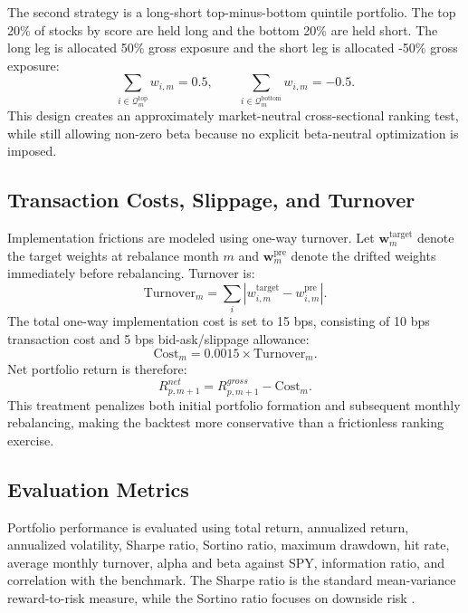 \documentclass[11pt, a4paper]{article}
\begin{document}
The second strategy is a long-short top-minus-bottom quintile portfolio. The top 20\% of stocks by score are held long and the bottom 20\% are held short. The long leg is allocated 50\% gross exposure and the short leg is allocated -50\% gross exposure:
\begin{equation}
\sum_{i\in\mathcal{Q}^{\text{top}}_{m}} w_{i,m}=0.5, \qquad
\sum_{i\in\mathcal{Q}^{\text{bottom}}_{m}} w_{i,m}=-0.5.
\end{equation}
This design creates an approximately market-neutral cross-sectional ranking test, while still allowing non-zero beta because no explicit beta-neutral optimization is imposed.

\subsection{Transaction Costs, Slippage, and Turnover}
Implementation frictions are modeled using one-way turnover. Let $\mathbf{w}_{m}^{\text{target}}$ denote the target weights at rebalance month $m$ and $\mathbf{w}_{m}^{\text{pre}}$ denote the drifted weights immediately before rebalancing. Turnover is:
\begin{equation}
\text{Turnover}_{m}=\sum_{i}\left|w^{\text{target}}_{i,m}-w^{\text{pre}}_{i,m}\right|.
\end{equation}
The total one-way implementation cost is set to 15 bps, consisting of 10 bps transaction cost and 5 bps bid-ask/slippage allowance:
\begin{equation}
\text{Cost}_{m}=0.0015\times \text{Turnover}_{m}.
\end{equation}
Net portfolio return is therefore:
\begin{equation}
R^{net}_{p,m+1}=R^{gross}_{p,m+1}-\text{Cost}_{m}.
\end{equation}
This treatment penalizes both initial portfolio formation and subsequent monthly rebalancing, making the backtest more conservative than a frictionless ranking exercise.

\subsection{Evaluation Metrics}
Portfolio performance is evaluated using total return, annualized return, annualized volatility, Sharpe ratio, Sortino ratio, maximum drawdown, hit rate, average monthly turnover, alpha and beta against SPY, information ratio, and correlation with the benchmark. The Sharpe ratio is the standard mean-variance reward-to-risk measure, while the Sortino ratio focuses on downside risk \citep{sharpe1966mutual, sortino1994performance}.
\end{document}
